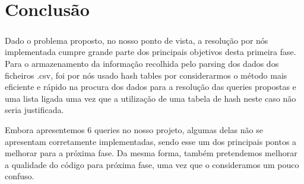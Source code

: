\documentclass[12pt,a4paper]{report}
\begin{document}
   
    

\newpage

    \chapter{Conclusão}

    \paragraph{}Dado o problema proposto, no nosso ponto de vista, a resolução por nós implementada
cumpre grande parte dos principais objetivos desta primeira fase. 
Para o armazenamento da informação recolhida pelo parsing dos dados dos ficheiros .csv, foi
por nós usado hash tables por considerarmos o método mais eficiente e rápido na procura dos
dados para a resolução das queries propostas e uma lista ligada uma vez que a utilização de uma tabela de hash neste caso não seria justificada.
\par Embora apresentemos 6 queries no nosso projeto, algumas delas não se apresentam corretamente implementadas, sendo esse um dos principais pontos a melhorar para a próxima fase. Da mesma forma, também pretendemos melhorar a qualidade do código para próxima fase, uma vez que o consideramos um pouco confuso.

        
\end{document}
